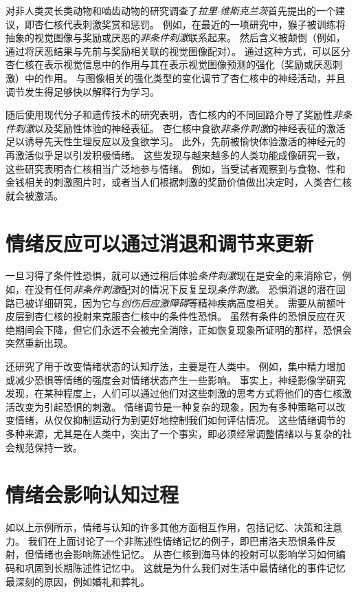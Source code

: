 对非人类灵长类动物和啮齿动物的研究调查了\textit{拉里$\cdot$维斯克兰茨}首先提出的一个建议，即杏仁核代表刺激奖赏和惩罚。
例如，在最近的一项研究中，猴子被训练将抽象的视觉图像与奖励或厌恶的\textit{非条件刺激}联系起来。
然后含义被颠倒（例如，通过将厌恶结果与先前与奖励相关联的视觉图像配对）。
通过这种方式，可以区分杏仁核在表示视觉信息中的作用与其在表示视觉图像预测的强化（奖励或厌恶刺激）中的作用。
与图像相关的强化类型的变化调节了杏仁核中的神经活动，并且调节发生得足够快以解释行为学习。


随后使用现代分子和遗传技术的研究表明，杏仁核内的不同回路介导了奖励性\textit{非条件刺激}以及奖励性体验的神经表征。
杏仁核中食欲\textit{非条件刺激}的神经表征的激活足以诱导先天性生理反应以及食欲学习。
此外，先前被愉快体验激活的神经元的再激活似乎足以引发积极情绪。
这些发现与越来越多的人类功能成像研究一致，这些研究表明杏仁核相当广泛地参与情绪。
例如，当受试者观察到与食物、性和金钱相关的刺激图片时，或者当人们根据刺激的奖励价值做出决定时，人类杏仁核就会被激活。



\section{情绪反应可以通过消退和调节来更新}

一旦习得了条件性恐惧，就可以通过稍后体验\textit{条件刺激}现在是安全的来消除它，例如，在没有任何\textit{非条件刺激}配对的情况下反复呈现\textit{条件刺激}。
恐惧消退的潜在回路已被详细研究，因为它与\textit{创伤后应激障碍}等精神疾病高度相关。
需要从前额叶皮层到杏仁核的投射来克服杏仁核中的条件性恐惧。
虽然有条件的恐惧反应在灭绝期间会下降，但它们永远不会被完全消除，正如恢复现象所证明的那样，恐惧会突然重新出现。


还研究了用于改变情绪状态的认知疗法，主要是在人类中。
例如，集中精力增加或减少恐惧等情绪的强度会对情绪状态产生一些影响。
事实上，神经影像学研究发现，在某种程度上，人们可以通过他们对这些刺激的思考方式将他们的杏仁核激活改变为引起恐惧的刺激。
情绪调节是一种复杂的现象，因为有多种策略可以改变情绪，从仅仅抑制运动行为到更好地控制我们如何评估情况。
这些情绪调节的多种来源，尤其是在人类中，突出了一个事实，即必须经常调整情绪以与复杂的社会规范保持一致。



\section{情绪会影响认知过程}

如以上示例所示，情绪与认知的许多其他方面相互作用，包括记忆、决策和注意力。
我们在上面讨论了一个非陈述性情绪记忆的例子，即巴甫洛夫恐惧条件反射，但情绪也会影响陈述性记忆。
从杏仁核到海马体的投射可以影响学习如何编码和巩固到长期陈述性记忆中。
这就是为什么我们对生活中最情绪化的事件记忆最深刻的原因，例如婚礼和葬礼。


